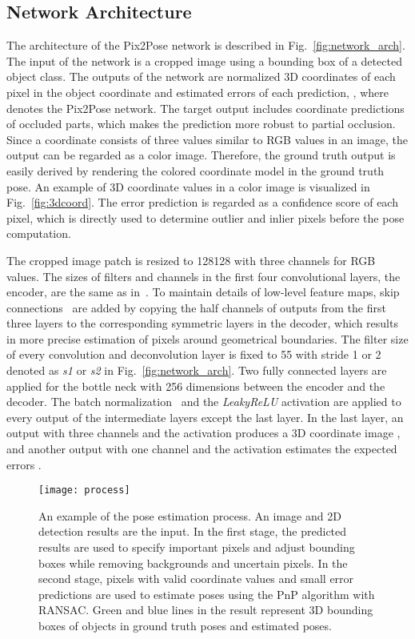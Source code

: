 \documentclass[10pt,twocolumn,letterpaper]{article}
\begin{document}
  
\subsection{Network Architecture}
The architecture of the Pix2Pose network is described in Fig.~\ref{fig:network_arch}.
The input of the network is a cropped image  using a bounding box of a detected object class. The outputs of the network are normalized 3D coordinates of each pixel  in the object coordinate and estimated errors  of each prediction, , where  denotes the Pix2Pose network. The target output includes coordinate predictions of occluded parts, which makes the prediction more robust to partial occlusion. Since a coordinate consists of three values similar to RGB values in an image, the output  can be regarded as a color image. Therefore, the ground truth output is easily derived by rendering the colored coordinate model in the ground truth pose. An example of 3D coordinate values in a color image is visualized in Fig.~\ref{fig:3dcoord}. The error prediction  is regarded as a confidence score of each pixel, which is directly used to determine outlier and inlier pixels before the pose computation.

 The cropped image patch is resized to 128128 with three channels for RGB values. The sizes of filters and channels in the first four convolutional layers, the encoder, are the same as in~\cite{Sundermeyer_2018_ECCV_implicit}. To maintain details of low-level feature maps, skip connections~\cite{ronneberger2015u_unet} are added by copying the half channels of outputs from the first three layers to the corresponding symmetric layers in the decoder, which results in more precise estimation of pixels around geometrical boundaries. The filter size of every convolution and deconvolution layer is fixed to 55 with stride 1 or 2 denoted as \textit{s1} or \textit{s2} in Fig.~\ref{fig:network_arch}. Two fully connected layers are applied for the bottle neck with 256 dimensions between the encoder and the decoder. The batch normalization~\cite{ioffe2015batchnorm} and the \textit{LeakyReLU} activation are applied to every output of the intermediate layers except the last layer. In the last layer, an output with three channels and the  activation produces a 3D coordinate image , and another output with one channel and the  activation estimates the expected errors .

\begin{figure*}
\begin{center}
   \def\svgwidth{\linewidth}
\texttt{[image: process]} 
\end{center}
\vspace{-5pt}
   \caption{An example of the pose estimation process. An image and 2D detection results are the input. In the first stage, the predicted results are used to specify important pixels and adjust bounding boxes while removing backgrounds and uncertain pixels. In the second stage, pixels with valid coordinate values and small error predictions are used to estimate poses using the PnP algorithm with RANSAC. Green and blue lines in the result represent 3D bounding boxes of objects in ground truth poses and estimated poses.
   }
\label{fig:detection_process}
\end{figure*}
\end{document}
